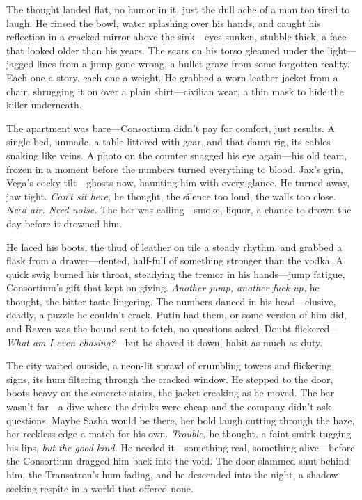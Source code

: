 \documentclass[12pt]{book}
\begin{document}
The thought landed flat, no humor in it, just the dull ache of a man too tired to laugh. He rinsed the bowl, water splashing over his hands, and caught his reflection in a cracked mirror above the sink—eyes sunken, stubble thick, a face that looked older than his years. The scars on his torso gleamed under the light—jagged lines from a jump gone wrong, a bullet graze from some forgotten reality. Each one a story, each one a weight. He grabbed a worn leather jacket from a chair, shrugging it on over a plain shirt—civilian wear, a thin mask to hide the killer underneath.

The apartment was bare—Consortium didn’t pay for comfort, just results. A single bed, unmade, a table littered with gear, and that damn rig, its cables snaking like veins. A photo on the counter snagged his eye again—his old team, frozen in a moment before the numbers turned everything to blood. Jax’s grin, Vega’s cocky tilt—ghosts now, haunting him with every glance. He turned away, jaw tight. \textit{Can’t sit here,} he thought, the silence too loud, the walls too close. \textit{Need air. Need noise.} The bar was calling—smoke, liquor, a chance to drown the day before it drowned him.

He laced his boots, the thud of leather on tile a steady rhythm, and grabbed a flask from a drawer—dented, half-full of something stronger than the vodka. A quick swig burned his throat, steadying the tremor in his hands—jump fatigue, Consortium’s gift that kept on giving. \textit{Another jump, another fuck-up,} he thought, the bitter taste lingering. The numbers danced in his head—elusive, deadly, a puzzle he couldn’t crack. Putin had them, or some version of him did, and Raven was the hound sent to fetch, no questions asked. Doubt flickered—\textit{What am I even chasing?}—but he shoved it down, habit as much as duty.

The city waited outside, a neon-lit sprawl of crumbling towers and flickering signs, its hum filtering through the cracked window. He stepped to the door, boots heavy on the concrete stairs, the jacket creaking as he moved. The bar wasn’t far—a dive where the drinks were cheap and the company didn’t ask questions. Maybe Sasha would be there, her bold laugh cutting through the haze, her reckless edge a match for his own. \textit{Trouble,} he thought, a faint smirk tugging his lips, \textit{but the good kind.} He needed it—something real, something alive—before the Consortium dragged him back into the void. The door slammed shut behind him, the Transatron’s hum fading, and he descended into the night, a shadow seeking respite in a world that offered none.
\end{document}
